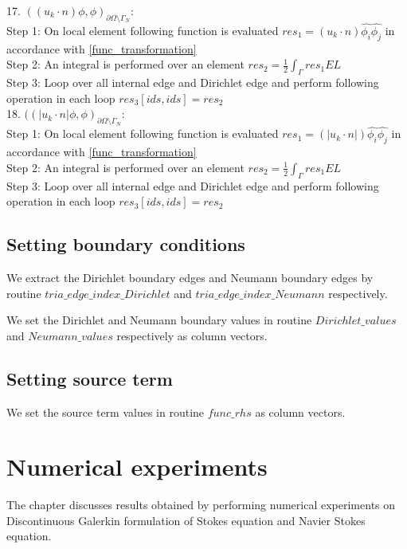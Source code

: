 \documentclass[a4paper,12pt]{book}
\begin{document}
17. $((u_k \cdot n)\phi,\phi)_{\partial \Omega \setminus \Gamma_N}$:\\
Step 1: On local element following function is evaluated $res_1 = (u_k \cdot n) \hat{\phi_i} \hat{\phi_j} $ in accordance with \ref{func_transformation}\\
Step 2: An integral is performed over an element $res_2 = \frac{1}{2} \int_{\Gamma} res_1 EL $\\
Step 3: Loop over all internal edge and Dirichlet edge and perform following operation in each loop $res_3[ids,ids] = res_2$\\

18. $((|u_k \cdot n| \phi,\phi)_{\partial \Omega \setminus \Gamma_N}$:\\
Step 1: On local element following function is evaluated $res_1 = (|u_k \cdot n|) \hat{\phi_i} \hat{\phi_j} $ in accordance with \ref{func_transformation}\\
Step 2: An integral is performed over an element $res_2 = \frac{1}{2} \int_{\Gamma} res_1 EL $\\
Step 3: Loop over all internal edge and Dirichlet edge and perform following operation in each loop $res_3[ids,ids] = res_2$\\

\section{Setting boundary conditions}

We extract the Dirichlet boundary edges and Neumann boundary edges by routine $tria\_edge\_index\_Dirichlet$ and $tria\_edge\_index\_Neumann$ respectively.

We set the Dirichlet and Neumann boundary values in routine $Dirichlet\_values$ and $Neumann\_values$ respectively as column vectors. 

\section{Setting source term}

We set the source term values in routine $func\_rhs$ as column vectors. 

\chapter{Numerical experiments}

The chapter discusses results obtained by performing numerical experiments on Discontinuous Galerkin formulation of Stokes equation and Navier Stokes equation.
\end{document}
